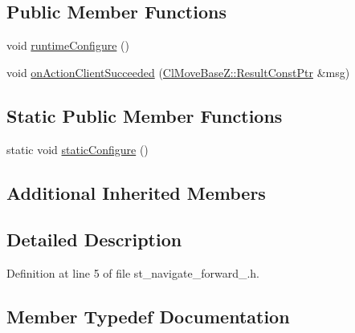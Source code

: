 \subsection*{Public Member Functions}
\begin{DoxyCompactItemize}
\item 
void \hyperlink{structsm__dance__bot_1_1StNavigateForward1_a970f2128e6f29396da2a1545d4dbdc04}{runtime\+Configure} ()
\item 
void \hyperlink{structsm__dance__bot_1_1StNavigateForward1_ab5af8fd66b5c39ffef4829233d449d55}{on\+Action\+Client\+Succeeded} (\hyperlink{classcl__move__base__z_1_1ClMoveBaseZ_a99373d0c15ae96684462d8677f5fd632}{Cl\+Move\+Base\+Z\+::\+Result\+Const\+Ptr} \&msg)
\end{DoxyCompactItemize}
\subsection*{Static Public Member Functions}
\begin{DoxyCompactItemize}
\item 
static void \hyperlink{structsm__dance__bot_1_1StNavigateForward1_a5c18e9458f6b9bd0e06f7f242e5bc2da}{static\+Configure} ()
\end{DoxyCompactItemize}
\subsection*{Additional Inherited Members}


\subsection{Detailed Description}


Definition at line 5 of file st\+\_\+navigate\+\_\+forward\+\_.\+h.



\subsection{Member Typedef Documentation}
\mbox{\label{structsm__dance__bot_1_1StNavigateForward1_a4a49d0c774d44f96b17ceac4c6628104}} 
